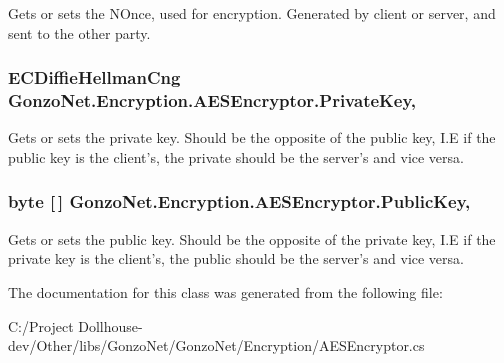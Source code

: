 Gets or sets the N\+Once, used for encryption. Generated by client or server, and sent to the other party. 

\hypertarget{class_gonzo_net_1_1_encryption_1_1_a_e_s_encryptor_a2fffc8dd757cf315c2b0e4093b970868}{
\subsubsection[{Private\+Key}]{\setlength{\rightskip}{0pt plus 5cm}E\+C\+Diffie\+Hellman\+Cng Gonzo\+Net.\+Encryption.\+A\+E\+S\+Encryptor.\+Private\+Key\hspace{0.3cm}{\ttfamily [get]}, {\ttfamily [set]}}}\label{class_gonzo_net_1_1_encryption_1_1_a_e_s_encryptor_a2fffc8dd757cf315c2b0e4093b970868}


Gets or sets the private key. Should be the opposite of the public key, I.\+E if the public key is the client's, the private should be the server's and vice versa. 

\hypertarget{class_gonzo_net_1_1_encryption_1_1_a_e_s_encryptor_acbfabbfe5f2218a86bee68d6ea2894f7}{
\subsubsection[{Public\+Key}]{\setlength{\rightskip}{0pt plus 5cm}byte \mbox{[}$\,$\mbox{]} Gonzo\+Net.\+Encryption.\+A\+E\+S\+Encryptor.\+Public\+Key\hspace{0.3cm}{\ttfamily [get]}, {\ttfamily [set]}}}\label{class_gonzo_net_1_1_encryption_1_1_a_e_s_encryptor_acbfabbfe5f2218a86bee68d6ea2894f7}


Gets or sets the public key. Should be the opposite of the private key, I.\+E if the private key is the client's, the public should be the server's and vice versa. 



The documentation for this class was generated from the following file\+:\begin{DoxyCompactItemize}
\item 
C\+:/\+Project Dollhouse-\/dev/\+Other/libs/\+Gonzo\+Net/\+Gonzo\+Net/\+Encryption/A\+E\+S\+Encryptor.\+cs\end{DoxyCompactItemize}
